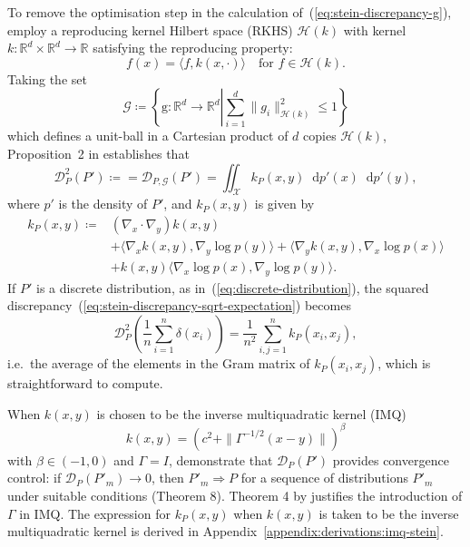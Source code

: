 \documentclass[11pt,a4paper]{report}
\newcommand*\diff{\mathop{}\!\mathrm{d}}
\begin{document}
To remove the optimisation step in the calculation of~(\ref{eq:stein-discrepancy-g}), \cite{gorhamMeasuringSampleQuality2017} employ a reproducing kernel Hilbert space (RKHS) $\mathcal{H}(k)$ with kernel $k: \mathbb{R}^d \times \mathbb{R}^d \to \mathbb{R}$ satisfying the reproducing property:
$$f(x) = \langle f, k(x, \cdot)\rangle \quad\text{for } f \in \mathcal{H}(k).$$
Taking the set
\begin{equation}
\mathcal{G} \coloneq \left\{ \mathrm{g} : \mathbb{R}^d \to \mathbb{R}^d \left| \sum_{i=1}^d \|g_i\|^2_{\mathcal{H}(k)} \leq 1 \right.\right\}
\label{eq:unit-ball}
\end{equation}
which defines a unit-ball in a Cartesian product of $d$ copies $\mathcal{H}(k)$, Proposition~2 in \cite{gorhamMeasuringSampleQuality2017} establishes that
\begin{equation}
\mathcal{D}_{P}^2(P') \coloneq = \mathcal{D}_{P, \mathcal{G}}(P') = \iint_\mathcal{X} k_P(x, y) \diff p'(x) \diff p'(y),
\label{eq:stein-discrepancy-sqrt-expectation}
\end{equation}
where $p'$ is the density of $P'$, and $k_P(x, y)$ is given by
\begin{equation}
\begin{aligned}
k_P(x, y) \coloneq 
&(\nabla_x\cdot\nabla_y) k(x,y) \\
&+ \langle \nabla_x k(x, y), \nabla_y \log p(y) \rangle + \langle \nabla_y k(x, y), \nabla_x \log p(x) \rangle \\
&+ k(x, y) \langle \nabla_x \log p(x), \nabla_y \log p(y) \rangle.
\label{eq:deriv:stein-kernel}
\end{aligned}
\end{equation}
If $P'$ is a discrete distribution, as in~(\ref{eq:discrete-distribution}), the squared discrepancy~(\ref{eq:stein-discrepancy-sqrt-expectation}) becomes
\begin{equation}
\mathcal{D}_{P}^2\left(\frac{1}{n} \sum_{i=1}^n \delta(x_i)\right) = \frac{1}{n^2} \sum_{i,j=1}^n k_P(x_i, x_j),
\label{eq:ksd:discrete}
\end{equation}
i.e.\ the average of the elements in the Gram matrix of $k_P(x_i, x_j)$, which is straightforward to compute.

When $k(x, y)$ is chosen to be the inverse multiquadratic kernel (IMQ)
\begin{equation}
k(x, y) = \left(c^2 + \|\Gamma^{-1/2}(x-y)\|\right)^\beta
\label{eq:imq}
\end{equation}
with $\beta \in (-1, 0)$ and $\Gamma = I$, \cite{gorhamMeasuringSampleQuality2017} demonstrate that $\mathcal{D}_{P}(P')$ provides convergence control: if $\mathcal{D}_{P}(P'_m) \to 0$, then $P'_m \Rightarrow P$ for a sequence of distributions $P'_m$ under suitable conditions (Theorem 8). Theorem 4 by \cite{chenSteinPointMarkov2019} justifies the introduction of $\Gamma$ in IMQ. The expression for $k_P(x, y)$ when $k(x, y)$ is taken to be the inverse multiquadratic kernel is derived in Appendix~\ref{appendix:derivations:imq-stein}.
\end{document}

